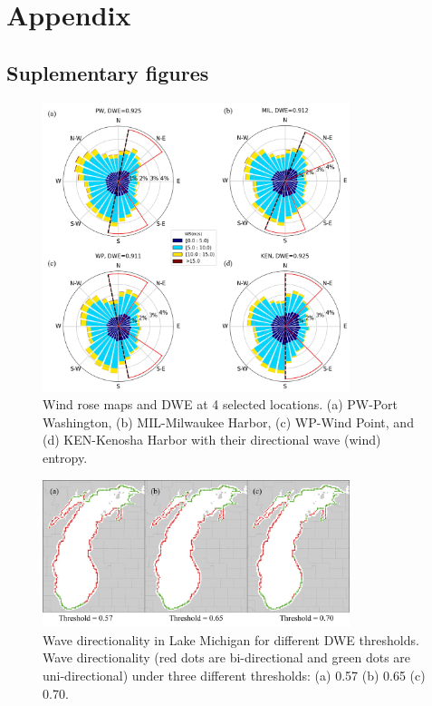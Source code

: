 

\chapter{Appendix}
\label{Appendix}

\section{Suplementary figures}
\label{Suplementary figures}

\begin{figure}[htbp]
  \centering
  \includegraphics[width=0.8\textwidth]{appendix/resources/figure3-1a.jpg}
  \caption{Wind rose maps and DWE at 4 selected locations. (a) PW-Port Washington, (b) MIL-Milwaukee Harbor, (c) WP-Wind Point, and (d) KEN-Kenosha Harbor with their directional wave (wind) entropy.}
  \label{fig:fig3.1a}
\end{figure}

\begin{figure}[htbp]
  \centering
  \includegraphics[width=0.8\textwidth]{appendix/resources/figure3-2a.jpg}
  \caption{Wave directionality in Lake Michigan for different DWE thresholds. Wave directionality (red dots are bi-directional and green dots are uni-directional) under three different thresholds: (a) 0.57 (b) 0.65 (c) 0.70.}
  \label{fig:fig3.2a}
\end{figure}

